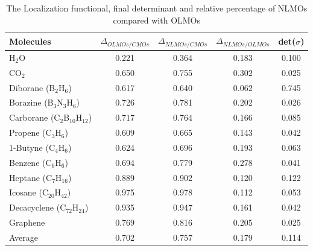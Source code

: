 \documentclass[aps,prl,reprint,amsmath,amssymb]{revtex4-1}
\begin{document}
\begin{table}[tb]
\caption{The Localization functional, final determinant and relative percentage of NLMOs compared with OLMOs}
\label{tab:loc}
\centering
\begin{tabular}{l c c c c}
\hline\hline
Molecules & $\varDelta_{OLMOs/CMOs}$  & $\varDelta_{NLMOs/CMOs}$ & $\varDelta_{NLMOs/OLMOs}$ & det($\sigma$) \\
\hline
H$_2$O & 0.221 & 0.364 & 0.183 & 0.100 \\ 
CO$_2$ & 0.650 & 0.755 & 0.302 & 0.025 \\
Diborane (B$_2$H$_6$) & 0.617 & 0.640 & 0.062 & 0.745 \\
Borazine (B$_3$N$_3$H$_6$) & 0.726 & 0.781 & 0.202 & 0.026 \\
Carborane (C$_2$B$_{10}$H$_{12}$) & 0.717 & 0.764 & 0.166 & 0.085 \\ 
Propene (C$_3$H$_6$) & 0.609 & 0.665 & 0.143 & 0.042 \\
1-Butyne (C$_4$H$_6$) & 0.624 & 0.696 & 0.193 & 0.063 \\
Benzene (C$_6$H$_6$) & 0.694 & 0.779 & 0.278 & 0.041 \\ 
Heptane (C$_7$H$_{16}$) & 0.889 & 0.902 & 0.120 & 0.122 \\ 
Icosane (C$_{20}$H$_{42}$) & 0.975 & 0.978 & 0.112 & 0.053 \\ 
Decacyclene (C$_{72}$H$_{24}$) & 0.935 & 0.947 & 0.161 & 0.042 \\ 
Graphene & 0.769 & 0.816 & 0.205 & 0.025 \\
Average & 0.702 & 0.757 & 0.179 & 0.114 \\
\hline
\end{tabular}
\label{table:nonlin}
\end{table}


\end{document}
